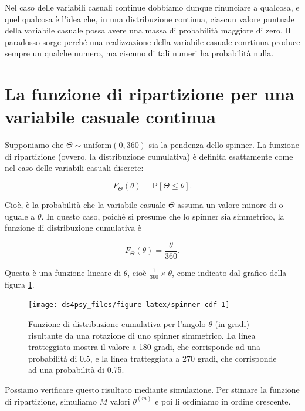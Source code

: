 \documentclass[
  11pt,
]{krantz}
\theoremstyle{definition}
\theoremstyle{definition}
\theoremstyle{definition}
\theoremstyle{definition}
\theoremstyle{remark}
\begin{document}
Nel caso delle variabili casuali continue dobbiamo dunque rinunciare a qualcosa, e quel qualcosa è l'idea che, in una distribuzione continua, ciascun valore puntuale della variabile casuale possa avere una massa di probabilità maggiore di zero. Il paradosso sorge perché una realizzazione della variabile casuale conrtinua produce sempre un qualche numero, ma ciscuno di tali numeri ha probabilità nulla.

\hypertarget{la-funzione-di-ripartizione-per-una-variabile-casuale-continua}{%
\section{La funzione di ripartizione per una variabile casuale continua}\label{la-funzione-di-ripartizione-per-una-variabile-casuale-continua}}

Supponiamo che \(\Theta \sim \mbox{uniform}(0, 360)\) sia la pendenza dello spinner. La funzione di ripartizione (ovvero, la distribuzione cumulativa) è definita esattamente come nel caso delle variabili casuali discrete:

\[
F_{\Theta}(\theta) = \mbox{P}[\Theta \leq \theta].
\]

Cioè, è la probabilità che la variabile casuale \(\Theta\) assuma un valore minore di o uguale a \(\theta\). In questo caso, poiché si presume che lo spinner sia simmetrico, la funzione di distribuzione cumulativa è

\[
F_{\Theta}(\theta) = \frac{\theta}{360}.
\]

Questa è una funzione lineare di \(\theta\), cioè \(\frac{1}{360} \times \theta\), come indicato dal grafico della figura \ref{fig:spinner-cdf}.

\begin{figure}[h]

{\centering \texttt{[image: ds4psy\_files/figure-latex/spinner-cdf-1]} 

}

\caption{Funzione di distribuzione cumulativa per l'angolo $\theta$ (in gradi) risultante da una rotazione di uno spinner simmetrico. La linea tratteggiata mostra il valore a 180 gradi, che corrisponde ad una probabilità di 0.5, e la linea tratteggiata a 270 gradi, che corrisponde ad una probabilità di 0.75.}\label{fig:spinner-cdf}
\end{figure}

Possiamo verificare questo risultato mediante simulazione. Per stimare la funzione di ripartizione, simuliamo \(M\) valori \(\theta^{(m)}\) e poi li ordiniamo in ordine crescente.
\end{document}
